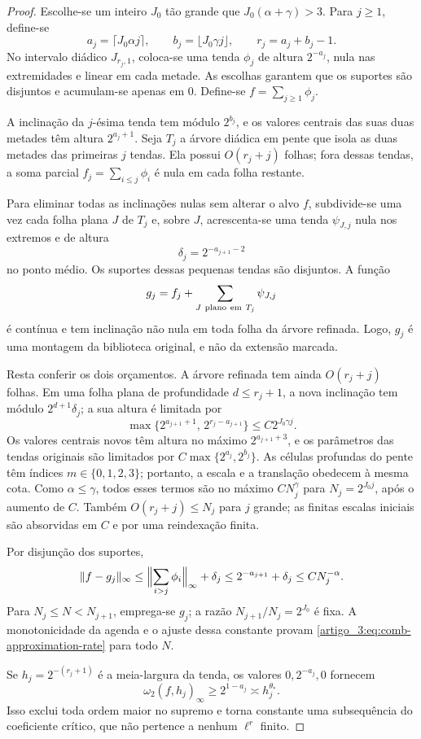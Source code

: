 \begin{proof}
Escolhe-se um inteiro $J_0$ tão grande que
$J_0(\alpha+\gamma)>3$. Para $j\ge1$, define-se
\[
 a_j=\lceil J_0\alpha j\rceil,
 \qquad b_j=\lfloor J_0\gamma j\rfloor,
 \qquad r_j=a_j+b_j-1.
\]
No intervalo diádico $J_{r_j,1}$, coloca-se uma tenda $\phi_j$ de altura
$2^{-a_j}$, nula nas extremidades e linear em cada metade. As escolhas
garantem que os suportes são disjuntos e acumulam-se apenas em $0$. Define-se
$f=\sum_{j\ge1}\phi_j$.

A inclinação da $j$-ésima tenda tem módulo $2^{b_j}$, e os valores centrais das
suas duas metades têm altura $2^{a_j+1}$. Seja $T_j$ a árvore diádica em pente
que isola as duas metades das primeiras $j$ tendas. Ela possui
$O(r_j+j)$ folhas; fora dessas tendas, a soma parcial
$f_j=\sum_{i\le j}\phi_i$ é nula em cada folha restante.

Para eliminar todas as inclinações nulas sem alterar o alvo $f$, subdivide-se uma
vez cada folha plana $J$ de $T_j$ e, sobre $J$, acrescenta-se uma tenda
$\psi_{J,j}$ nula nos extremos e de altura
\[
 \delta_j=2^{-a_{j+1}-2}
\]
no ponto médio. Os suportes dessas pequenas tendas são disjuntos. A função
\[
 g_j=f_j+\sum_{J\ {\rm plano\ em}\ T_j}\psi_{J,j}
\]
é contínua e tem inclinação não nula em toda folha da árvore refinada. Logo,
$g_j$ é uma montagem da biblioteca original, e não da extensão marcada.

Resta conferir os dois orçamentos. A árvore refinada tem ainda
$O(r_j+j)$ folhas. Em uma folha plana de profundidade $d\le r_j+1$, a nova
inclinação tem módulo $2^{d+1}\delta_j$; a sua altura é limitada por
\[
 \max\{2^{a_{j+1}+1},\,2^{r_j-a_{j+1}}\}
 \le C2^{J_0\gamma j}.
\]
Os valores centrais novos têm altura no máximo $2^{a_{j+1}+3}$, e os
parâmetros das tendas originais são limitados por
$C\max\{2^{a_j},2^{b_j}\}$. As células profundas do pente têm índices
$m\in\{0,1,2,3\}$; portanto, a escala e a translação obedecem à mesma cota.
Como $\alpha\le\gamma$, todos esses termos são no máximo
$CN_j^\gamma$ para $N_j=2^{J_0j}$, após o aumento de $C$. Também
$O(r_j+j)\le N_j$ para $j$ grande; as finitas escalas iniciais são
absorvidas em $C$ e por uma reindexação finita.

Por disjunção dos suportes,
\[
 \|f-g_j\|_\infty
 \le \Bigl\|\sum_{i>j}\phi_i\Bigr\|_\infty+\delta_j
 \le 2^{-a_{j+1}}+\delta_j
 \le C N_j^{-\alpha}.
\]
Para $N_j\le N<N_{j+1}$, emprega-se $g_j$; a razão
$N_{j+1}/N_j=2^{J_0}$ é fixa. A monotonicidade da agenda e o ajuste dessa
constante provam \eqref{artigo_3:eq:comb-approximation-rate} para todo $N$.

Se $h_j=2^{-(r_j+1)}$ é a meia-largura da tenda, os valores
$0,2^{-a_j},0$ fornecem
\[
 \omega_2(f,h_j)_\infty\ge2^{1-a_j}\asymp h_j^{\theta_*}.
\]
Isso exclui toda ordem maior no supremo e torna constante uma subsequência do
coeficiente crítico, que não pertence a nenhum $\ell^r$ finito.
\end{proof}

